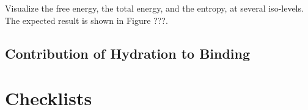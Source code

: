 \documentclass[9pt,tutorial]{livecoms}
\begin{document}
Visualize the free energy, the total energy, and the entropy, at several iso-levels.
The expected result is shown in Figure ???.

\subsection{Contribution of Hydration to Binding}

%

\section{Checklists}
\end{document}
